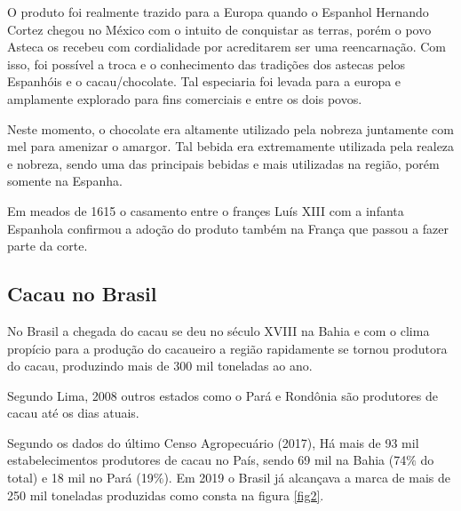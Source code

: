 \documentclass[
	12pt,				%
	openright,			%
	oneside,			%
	a4paper,			%
	english,			%
	french,				%
	spanish,			%
	brazil				%
	]{abntex2}
\begin{document}
O produto foi realmente trazido para a Europa quando o Espanhol Hernando Cortez chegou no México com o intuito de conquistar as terras, porém o povo Asteca os recebeu com cordialidade por acreditarem ser uma reencarnação. Com isso, foi possível a troca e o conhecimento das tradições dos astecas pelos Espanhóis e o cacau/chocolate. Tal especiaria foi levada para a europa e amplamente explorado para fins comerciais e entre os dois povos. \cite{7}

Neste momento, o chocolate era altamente utilizado pela nobreza juntamente com mel para amenizar o amargor. Tal bebida era extremamente utilizada pela realeza e nobreza, sendo uma das principais bebidas e mais utilizadas na região, porém somente na Espanha.

Em meados de 1615 o casamento entre o françes Luís XIII com a infanta Espanhola confirmou a adoção do produto também na França que passou a fazer parte da corte.

\subsection{Cacau no Brasil}

No Brasil a chegada do cacau se deu no século XVIII na Bahia e com o clima propício para a produção do cacaueiro a região rapidamente se tornou produtora do cacau, produzindo mais de 300 mil toneladas ao ano. \cite{1} \cite{7}

Segundo Lima, 2008 outros estados como o Pará e Rondônia são produtores de cacau até os dias atuais.

Segundo os dados do último Censo Agropecuário (2017), Há mais de 93 mil estabelecimentos produtores de cacau no País, sendo 69 mil na Bahia (74$\%$ do total) e 18 mil no Pará (19$\%$). Em 2019 o Brasil já alcançava a marca de mais de 250 mil toneladas produzidas como consta na figura \ref{fig2}. \cite{7}
\end{document}
